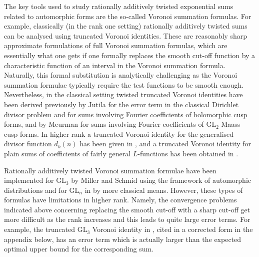\documentclass[a4paper,10pt,twoside]{amsart}
\theoremstyle{definition}
\numberwithin{equation}{section}
\renewcommand\:{\colon}
\begin{document}
The key tools used to study rationally additively twisted exponential sums related to automorphic forms are the so-called Voronoi summation formulas. For example, classically (in the rank one setting) rationally additively twisted sums can be analysed using truncated Voronoi identities. These are reasonably sharp approximate formulations of full Voronoi summation formulas, which are essentially what one gets if one formally replaces the smooth cut-off function by a characteristic function of an interval in the Voronoi summation formula. Naturally, this formal substitution is analytically challenging as the Voronoi summation formulae typically require the test functions to be smooth enough. Nevertheless, in the classical setting twisted truncated Voronoi identities have been derived previously by Jutila \cite{Jutila1985} for the error term in the classical Dirichlet divisor problem and for sums involving Fourier coefficients of holomorphic cusp forms, and by Meurman \cite{Meurman2} for sums involving Fourier coefficients of $\mathrm{GL}_2$ Maass cusp forms. In higher rank a truncated Voronoi identity for the generalised divisor function $d_k(n)$ has been given in \cite[(3.23)]{Ivic3}, and a truncated Voronoi identity for plain sums of coefficients of fairly general $L$-functions has been obtained in \cite{Friedlander--Iwaniec}.

Rationally additively twisted Voronoi summation formulae have been implemented for $\mathrm{GL}_3$ by Miller and Schmid \cite{Miller--Schmid} using the framework of automorphic distributions and for $\mathrm{GL}_n$ in \cite{Goldfeld--Li1} by more classical means. However, these types of formulas have limitations in higher rank. Namely, the convergence problems indicated above concerning replacing the smooth cut-off with a sharp cut-off get more difficult as the rank increases and this leads to quite large error terms. For example, the truncated $\mathrm{GL}_3$ Voronoi identity in \cite{Jaasaari--Vesalainen1}, cited in a corrected form in the appendix below, has an error term which is actually larger than the expected optimal upper bound for the corresponding sum.
\end{document}
